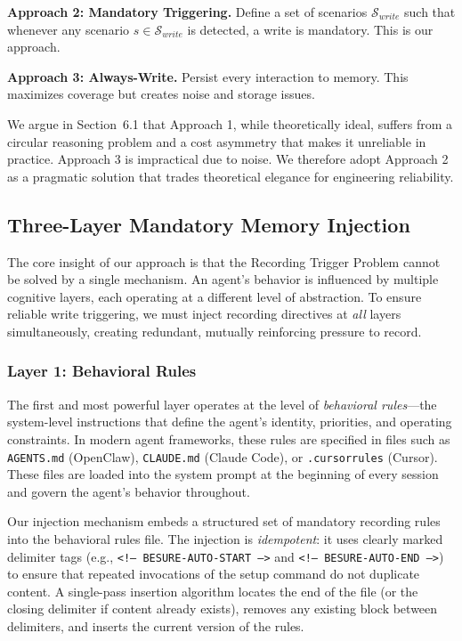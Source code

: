\documentclass[11pt]{article}
\begin{document}
\textbf{Approach 2: Mandatory Triggering.} Define a set of scenarios $\mathcal{S}_{write}$ such that whenever any scenario $s \in \mathcal{S}_{write}$ is detected, a write is mandatory. This is our approach.

\textbf{Approach 3: Always-Write.} Persist every interaction to memory. This maximizes coverage but creates noise and storage issues.

We argue in Section~6.1 that Approach 1, while theoretically ideal, suffers from a circular reasoning problem and a cost asymmetry that makes it unreliable in practice. Approach 3 is impractical due to noise. We therefore adopt Approach 2 as a pragmatic solution that trades theoretical elegance for engineering reliability.

\subsection{Three-Layer Mandatory Memory Injection}

The core insight of our approach is that the Recording Trigger Problem cannot be solved by a single mechanism. An agent's behavior is influenced by multiple cognitive layers, each operating at a different level of abstraction. To ensure reliable write triggering, we must inject recording directives at \emph{all} layers simultaneously, creating redundant, mutually reinforcing pressure to record.

\subsubsection{Layer 1: Behavioral Rules}

The first and most powerful layer operates at the level of \emph{behavioral rules}---the system-level instructions that define the agent's identity, priorities, and operating constraints. In modern agent frameworks, these rules are specified in files such as \texttt{AGENTS.md} (OpenClaw), \texttt{CLAUDE.md} (Claude Code), or \texttt{.cursorrules} (Cursor). These files are loaded into the system prompt at the beginning of every session and govern the agent's behavior throughout.

Our injection mechanism embeds a structured set of mandatory recording rules into the behavioral rules file. The injection is \emph{idempotent}: it uses clearly marked delimiter tags (e.g., \texttt{<!-- BESURE-AUTO-START -->} and \texttt{<!-- BESURE-AUTO-END -->}) to ensure that repeated invocations of the setup command do not duplicate content. A single-pass insertion algorithm locates the end of the file (or the closing delimiter if content already exists), removes any existing block between delimiters, and inserts the current version of the rules.
\end{document}
